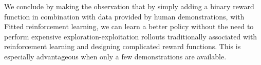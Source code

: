 \documentclass[final,3p,times,twocolumn]{elsarticle}
\begin{document}
We conclude by making the observation that by simply adding a binary reward function in combination with 
data provided by human demonstrations, with Fitted reinforcement learning, we can learn a better policy without 
the need to perform expensive exploration-exploitation rollouts traditionally associated with reinforcement learning and 
designing complicated reward functions. This is especially advantageous when only a few demonstrations are available.


\appendix


 

\end{document}
